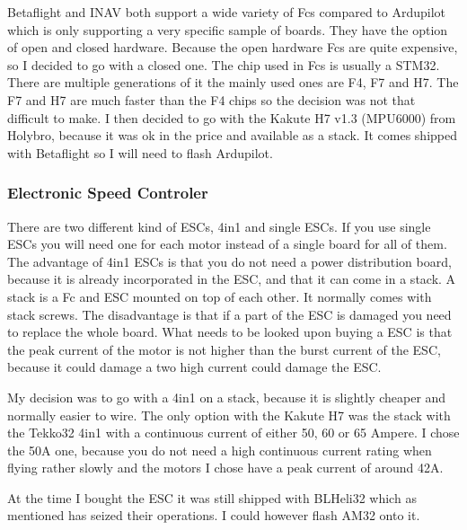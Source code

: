 \documentclass{article}
\begin{document}
	Betaflight and INAV both support a wide variety of \gls{Fc}s compared to Ardupilot which is only supporting a very specific sample of boards\cite{FcSupport}. They have the option of open and closed hardware. Because the open hardware \gls{Fc}s are quite expensive, so I decided to go with a closed one. The chip used in \gls{Fc}s is usually a STM32. There are multiple generations of it the mainly used ones are F4, F7 and H7. The F7 and H7 are much faster than the F4 chips so the decision was not that difficult to make. I then decided to go with the Kakute H7 v1.3 (MPU6000)\cite{KakuteH7} from Holybro, because it was ok in the price and available as a stack. It comes shipped with Betaflight so I will need to flash Ardupilot. 




	\subsubsection[ESC]{Electronic Speed Controler}
	There are two different kind of \gls{ESC}s, 4in1 and single \gls{ESC}s. If you use single \gls{ESC}s you will need one for each motor instead of a single board for all of them. The advantage of 4in1 \gls{ESC}s is that you do not need a power distribution board, because it is already incorporated in the \gls{ESC}, and that it can come in a stack. A stack is a \gls{Fc} and \gls{ESC} mounted on top of each other. It normally comes with stack screws. The disadvantage is that if a part of the \gls{ESC} is damaged you need to replace the whole board. What needs to be looked upon buying a \gls{ESC} is that the peak current of the motor is not higher than the burst current of the \gls{ESC}, because it could damage a two high current could damage the \gls{ESC}.
	
	My decision was to go with a 4in1 on a stack, because it is slightly cheaper and normally easier to wire. The only option with the Kakute H7 was the stack with the Tekko32 4in1 with a continuous current of either 50, 60 or 65 Ampere. I chose the 50A\cite{Tekko32} one, because you do not need a high continuous current rating when flying rather slowly and the motors I chose have a peak current of around 42A. 
	
	At the time I bought the \gls{ESC} it was still shipped with BLHeli32 which as mentioned has seized their operations. I could however flash AM32 onto it.
\end{document}
